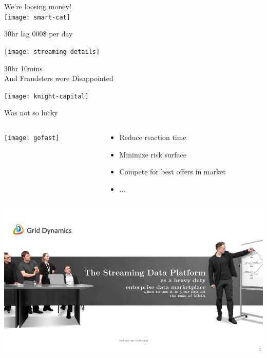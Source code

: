 \documentclass[aspectratio=169, 15pt,usenames,dvipsnames]{beamer}
\begin{document}
\begin{gdsw}
	\centering\Large We're loosing money!\\
	\texttt{[image: smart-cat]} 
	\par\centering
	\pause
	30hr lag  000\$ per day
\end{gdsw}
\begin{gdsw}
\end{gdsw}	
\begin{gdsw}
\end{gdsw}
\begin{gdsw}
	\centering\texttt{[image: streaming-details]} 
	\par\pause\Large
	30hr \rightarrow \Rightarrow 10mins\\
	And Fraudsters were Disappointed
\end{gdsw}
\begin{gdsw}
	\centering\texttt{[image: knight-capital]} 
	\par
	Was not so lucky
\end{gdsw}
\begin{gdsw}		
	\begin{columns}
		\begin{column}{0.4\textwidth}
			\centering\texttt{[image: gofast]} 
		\end{column}
		\begin{column}{0.6\textwidth}
			\large\centering 
			\begin{itemize}
				\item Reduce reaction time
				\item Minimize risk surface
				\item Compete for best offers in market
				\item ...
			\end{itemize}	
		\end{column}
	\end{columns}
\end{gdsw}
\begin{gdsw}
	\centering\includegraphics[height=\textheight]{sdp}         
\end{gdsw}
\end{document}
